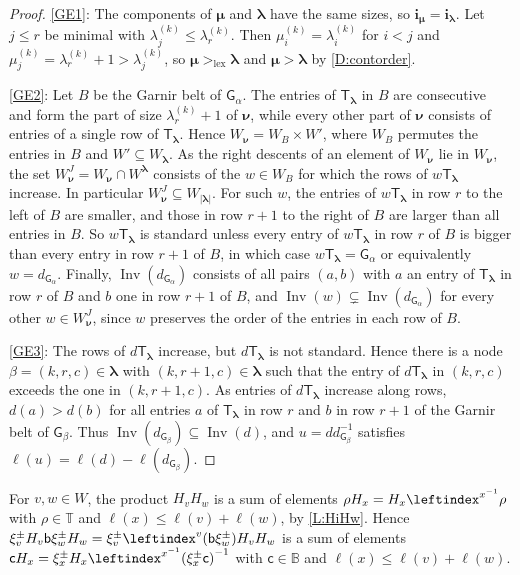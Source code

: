 \documentclass[a4paper,11pt]{amsart}
\newcommand\blam{{\boldsymbol\lambda}}
\newcommand\bmu{{\boldsymbol\mu}}
\newcommand\bnu{{\boldsymbol\nu}}
\newcommand\bi{\mathbf{i}}
\newcommand\ilam[1][\blam]{\bi_{#1}}
\numberwithin{equation}{subsection}
\theoremstyle{definition}
\theoremstyle{theorem}
\theoremstyle{remark}
\newcommand\Sym{W}
\newcommand\xipm{\xi^\pm}
\newcommand\bb{\mathsf{b}}
\newcommand\bc{\mathsf{c}}
\newcommand\bG{\mathsf{G}}
\newcommand\Tlam[1][\blam]{{\mathsf{T}_{#1}}}
\newcommand\op{\operatorname}
\newcommand\Tos{\mathbb{T}}
\newcommand{\Bo}{\mathbb{B}}
\begin{document}
\begin{proof}
  \autoref{GE1}: The components of $\bmu$ and $\blam$ have the same sizes, so $\bi_\bmu=\ilam$.
  Let $j\le r$ be minimal with $\lambda^{(k)}_j\le\lambda^{(k)}_r$. Then $\mu^{(k)}_i=\lambda^{(k)}_i$
  for $i<j$ and $\mu^{(k)}_j=\lambda^{(k)}_r+1>\lambda^{(k)}_j$, so $\bmu>_{\mathrm{lex}}\blam$ and
  $\bmu>\blam$ by \autoref{D:contorder}.

  \autoref{GE2}: Let $B$ be the Garnir belt of $\bG_\alpha$. The entries of $\Tlam$ in $B$ are
  consecutive and form the part of size $\lambda^{(k)}_r+1$ of $\bnu$, while every other part of
  $\bnu$ consists of entries of a single row of $\Tlam$. Hence $\Sym_\bnu=\Sym_B\times\Sym'$, where
  $\Sym_B$ permutes the entries in $B$ and $\Sym'\subseteq\Sym_\blam$. As the right descents of an
  element of $\Sym_\bnu$ lie in $\Sym_\bnu$, the set $\Sym^J_\bnu=\Sym_\bnu\cap\Sym^\blam$ consists
  of the $w\in\Sym_B$ for which the rows of $w\Tlam$ increase. In particular
  $\Sym^J_\bnu\subseteq\Sym_{|\blam|}$. For such $w$, the entries of $w\Tlam$ in row $r$ to the
  left of $B$ are smaller, and those in row $r+1$ to the right of $B$ are larger than all entries in
  $B$. So $w\Tlam$ is standard unless every entry of $w\Tlam$ in row $r$ of $B$ is bigger than every entry
  in row $r+1$ of $B$, in which case $w\Tlam=\bG_\alpha$ or equivalently $w=d_{\bG_\alpha}$. Finally,
  $\op{Inv}(d_{\bG_\alpha})$ consists of all pairs $(a,b)$ with $a$ an entry of $\Tlam$ in row $r$ of $B$
  and $b$ one in row $r+1$ of $B$, and $\op{Inv}(w)\subsetneq\op{Inv}(d_{\bG_\alpha})$ for every other
  $w\in\Sym^J_\bnu$, since $w$ preserves the order of the entries in each row of $B$.

  \autoref{GE3}: The rows of $d\Tlam$ increase, but $d\Tlam$ is not standard. Hence there is a
  node $\beta=(k,r,c)\in\blam$ with $(k,r+1,c)\in\blam$ such that the entry of $d\Tlam$ in
  $(k,r,c)$ exceeds the one in $(k,r+1,c)$. As entries of $d\Tlam$ increase along rows, $d(a)>d(b)$ for all
  entries $a$ of $\Tlam$ in row $r$ and $b$ in row $r+1$ of the Garnir belt of $\bG_\beta$. Thus
  $\op{Inv}(d_{\bG_\beta})\subseteq\op{Inv}(d)$, and $u=dd_{\bG_\beta}^{-1}$ satisfies
  $\ell(u)=\ell(d)-\ell(d_{\bG_\beta})$.
\end{proof}

\begin{Remark}\label{R:products}
  For $v,w\in\Sym$, the product $H_vH_w$ is a sum of elements $\rho H_x=H_x\leftindex^{x^{-1}}{\rho}$ with $\rho\in\Tos$ and $\ell(x)\le\ell(v)+\ell(w)$, by \autoref{L:HiHw}.
 Hence $\xipm_vH_v\bb\xipm_wH_w=\xipm_v\leftindex^v(\bb\xipm_w)H_vH_w$ is a sum of elements $\bc H_x=\xipm_xH_x\leftindex^{x^{-1}}{(\xipm_x\bc)}^{-1}$  with $\bc\in\Bo$ and $\ell(x)\le\ell(v)+\ell(w)$.
\end{Remark}
\end{document}
